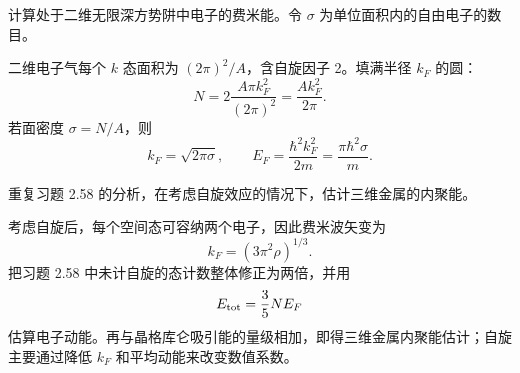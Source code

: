 \begin{question}
计算处于二维无限深方势阱中电子的费米能。令 $\sigma$ 为单位面积内的自由电子的数目。
\end{question}
\begin{solution}

二维电子气每个 $k$ 态面积为 $(2\pi)^2/A$，含自旋因子 2。填满半径 $k_F$ 的圆：
\[
N=2\frac{A\pi k_F^2}{(2\pi)^2}=\frac{A k_F^2}{2\pi}.
\]
若面密度 $\sigma=N/A$，则
\[
k_F=\sqrt{2\pi\sigma},
\qquad
E_F=\frac{\hbar^2k_F^2}{2m}=\frac{\pi\hbar^2\sigma}{m}.
\]

\end{solution}

\begin{question}
重复习题 2.58 的分析，在考虑自旋效应的情况下，估计三维金属的内聚能。
\end{question}
\begin{solution}

考虑自旋后，每个空间态可容纳两个电子，因此费米波矢变为
\[
k_F=(3\pi^2\rho)^{1/3}.
\]
把习题 2.58 中未计自旋的态计数整体修正为两倍，并用
\[
E_{\rm tot}=\frac35NE_F
\]
估算电子动能。再与晶格库仑吸引能的量级相加，即得三维金属内聚能估计；自旋主要通过降低 $k_F$ 和平均动能来改变数值系数。

\end{solution}

